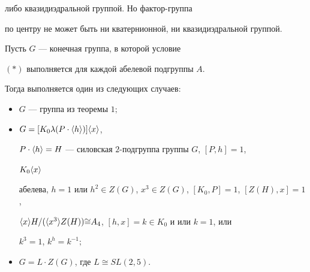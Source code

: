либо квазидиэдральной группой. Но фактор-группа


по центру не может быть ни кватернионной, ни квазидиэдральной группой.





\begin{thm}


Пусть $G$ --- конечная группа, в которой условие


$(\ast)$ выполняется для каждой абелевой подгруппы $A$.


Тогда выполняется один из следующих случаев\/${:}$


\begin{itemize}


\item[1)] $G$ --- группа из теоремы $1;$


\item[2)] $G=[K_0\lambda(P\cdot\langle h\rangle)]\langle x\rangle$,


$P\cdot\langle h\rangle=H$ --- силовская $2$-подгруппа группы $G$, $[P,h]=1$,


$K_0\langle x\rangle$ 


абелева, $h{=}1$ или $h^2\in Z(G)$, $x^3\in Z(G)$, $[K_0,P]=1$, $[Z(H),x]=1$,


$\langle x\rangle H/(\langle x^3\rangle Z(H)){\cong} A_4$, $[h,x]=k\in K_0$ и или $k=1$, или


$k^3=1$, $k^h=k^{-1};$


\item[3)] $G=L\cdot Z(G)$, где $L\cong SL(2,5)$.


\end{itemize}


\end{thm}





